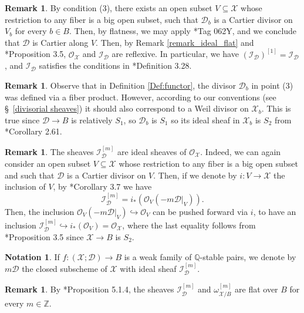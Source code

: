 \documentclass{amsart}
\newcommand{\bQ}{\mathbb{Q}}
\newcommand{\bZ}{\mathbb{Z}}
\newcommand{\cD}{\mathcal{D}}
\newcommand{\cI}{\mathcal{I}}
\newcommand{\cO}{\mathcal{O}}
\newcommand{\cX}{\mathcal{X}}
\theoremstyle{definition}
\newtheorem{Notation}[theorem]{Notation}
\newtheorem{Remark}[theorem]{Remark}
\def\O#1.{\mathcal {O}_{#1}}
\begin{document}
\begin{Remark}
By condition (3), there exists an open subset $V\subseteq \cX$ whose restriction to any fiber is a big open subset, such that $\cD_b$ is a Cartier divisor on $V_b$ for every $b \in B$.
Then, by flatness, we may apply \cite{stacks-project}*{Tag 062Y}, and we conclude that $\cD$ is Cartier along $V$.
Then, by Remark \ref{remark_ideal_flat} and \cite{HK04}*{Proposition 3.5}, $\O \cX.$ and $\cI_\cD$ are reflexive.
In particular, we have $(\cI_\cD)^{[1]} = \cI_\cD$, and $\cI_\cD$ satisfies the conditions in \cite{kol_new}*{Definition 3.28}.
\end{Remark}

\begin{Remark}
Observe that in Definition \ref{Def:functor}, the divisor $\cD_b$ in point (3) was defined via a fiber product.
However, according to our conventions (see \S~\ref{divisorial sheaves}) it should also correspond to a Weil divisor on $\cX_b$.
This is true since $\cD\to B$ is relatively $S_1$, so $\cD_b$ is $S_1$ so its ideal sheaf in $\cX_b$ is $S_2$ from \cite{Kol13}*{Corollary 2.61}. 
\end{Remark}




\begin{Remark}
The sheaves $\cI_\cD^{[m]}$ are ideal sheaves of $\cO_\cX$.
Indeed, we can again consider an open subset $V\subseteq \cX$ whose restriction to any fiber is a big open subset and such that $\cD$ is a Cartier divisor on $V$.
Then, if we denote by $i \colon V\to \cX$ the inclusion of $V$, by \cite{HK04}*{Corollary 3.7} we have
\[
\cI_\cD^{[m]} = i_*(\cO_V(-m\cD|_{V})).
\]
Then, the inclusion 
$\cO_V(-m\cD|_{V})\hookrightarrow \cO_V$ can be pushed forward via $i$, to have an inclusion $\cI_\cD^{[m]}\hookrightarrow i_*(\cO_V)=\cO_\cX$, where the last equality follows from \cite{HK04}*{Proposition 3.5} since $\cX\to B$ is $S_2$.
\end{Remark}
\begin{Notation}\label{Notation_mD_for_pstable_fam}
If $f \colon (\cX;\cD)\to B$ is a weak family of $\bQ$-stable pairs, we denote by $m\cD$ the closed subscheme of $\cX$ with ideal sheaf $\cI^{[m]}_\cD$. 
\end{Notation}


\begin{Remark}\label{remark:bc:implies:flat}
By \cite{AH11}*{Proposition 5.1.4}, the sheaves $\cI_\cD^{[m]}$ and $\omega_{\cX/B}^{[m]}$ are flat over $B$ for every $m\in \bZ$.
\end{Remark}
\end{document}
